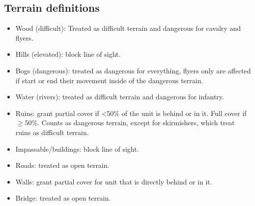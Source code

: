 \subsection{Terrain definitions}
\begin{itemize}
  \item Wood (difficult): Treated as difficult terrain and dangerous for cavalry and flyers.
  \item Hills (elevated): block line of sight.
  \item Bogs (dangerous): treated as dangerous for everything, flyers only are affected if start or end their movement inside of the dangerous terrain.
  \item Water (rivers): treated as difficult terrain and dangerous for infantry.
  \item Ruins: grant partial cover if <50\% of the unit is behind or in it. Full cover if $\geq$50\%. Counts as dangerous terrain, except for skirmishers, which treat ruins as difficult terrain.
  \item Impassable/buildings: block line of sight.
  \item Roads: treated as open terrain.
  \item Walls: grant partial cover for unit that is directly behind or in it.
  \item Bridge: treated as open terrain.
\end{itemize}
